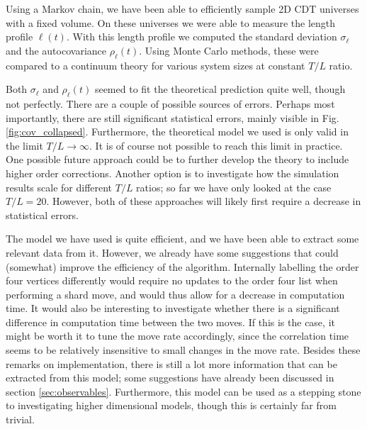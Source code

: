 Using a Markov chain, we have been able to efficiently sample 2D CDT universes with a fixed volume. On these universes we were able to measure the length profile $\ell(t)$. With this length profile we computed the standard deviation $\sigma_\ell$ and the autocovariance $\rho_\ell(t)$. Using Monte Carlo methods, these were compared to a continuum theory for various system sizes at constant $T/L$ ratio.

Both $\sigma_\ell$ and $\rho_\ell(t)$ seemed to fit the theoretical prediction quite well, though not perfectly. There are a couple of possible sources of errors. Perhaps most importantly, there are still significant statistical errors, mainly visible in Fig. \ref{fig:cov_collapsed}. Furthermore, the theoretical model we used is only valid in the limit $T/L \to \infty$. It is of course not possible to reach this limit in practice. One possible future approach could be to further develop the theory to include higher order corrections. Another option is to investigate how the simulation results scale for different $T/L$ ratios; so far we have only looked at the case $T/L = 20$. However, both of these approaches will likely first require a decrease in statistical errors.

The model we have used is quite efficient, and we have been able to extract some relevant data from it. However, we already have some suggestions that could (somewhat) improve the efficiency of the algorithm. Internally labelling the order four vertices differently would require no updates to the order four list when performing a shard move, and would thus allow for a decrease in computation time. It would also be interesting to investigate whether there is a significant difference in computation time between the two moves. If this is the case, it might be worth it to tune the move rate accordingly, since the correlation time seems to be relatively insensitive to small changes in the move rate. Besides these remarks on implementation, there is still a lot more information that can be extracted from this model; some suggestions have already been discussed in section \ref{sec:observables}. Furthermore, this model can be used as a stepping stone to investigating higher dimensional models, though this is certainly far from trivial.
